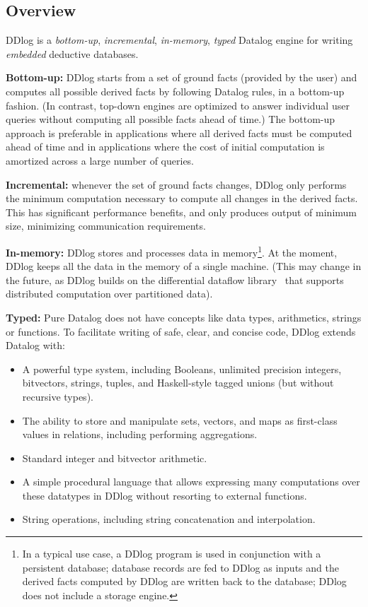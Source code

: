 \subsection{Overview}

DDlog is a \emph{bottom-up}, \emph{incremental}, \emph{in-memory}, \emph{typed} Datalog engine for
writing \emph{embedded} deductive databases.

\textbf{Bottom-up:} DDlog starts from a set of ground facts (provided
by the user) and computes all possible derived facts by following
Datalog rules, in a bottom-up fashion.  (In contrast, top-down engines
are optimized to answer individual user queries without computing all
possible facts ahead of time.)  The bottom-up approach is preferable
in applications where all derived facts must be computed ahead of time
and in applications where the cost of initial computation is amortized
across a large number of queries.

\textbf{Incremental:} whenever the set of ground facts changes, DDlog
only performs the minimum computation necessary to compute all changes
in the derived facts.  This has significant performance benefits, and
only produces output of minimum size, minimizing communication
requirements.

\textbf{In-memory:} DDlog stores and processes data in
memory\footnote{In a typical use case, a DDlog program is used in
  conjunction with a persistent database; database records are fed to
  DDlog as inputs and the derived facts computed by DDlog are written
  back to the database; DDlog does not include a storage engine.}.  At
the moment, DDlog keeps all the data in the memory of a single
machine.  (This may change in the future, as DDlog builds on the
differential dataflow library~\cite{dd} that supports distributed
computation over partitioned data).

\textbf{Typed:} Pure Datalog does not have concepts like data types,
arithmetics, strings or functions.  To facilitate writing of safe,
clear, and concise code, DDlog extends Datalog with:
\begin{itemize}
\item A powerful type system, including Booleans, unlimited
  precision integers, bitvectors, strings, tuples, and
  Haskell-style tagged unions (but without recursive types).
  
\item The ability to store and manipulate sets, vectors, and maps as
  first-class values in relations, including performing aggregations.
  
\item Standard integer and bitvector arithmetic.
  
\item A simple procedural language that allows expressing many
  computations over these datatypes in DDlog without resorting to
  external functions.
  
\item String operations, including string concatenation and
  interpolation.
\end{itemize}

